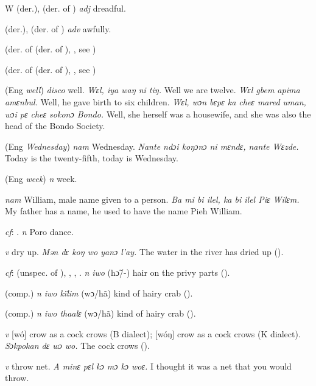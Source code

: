 \begin{letter}{W}
 (der.), (der. of ) \textit{adj} dreadful.

 (der.), (der. of ) \textit{adv} awfully. 

 (der. of  (der. of ), , see ) 

 (der. of  (der. of ), , see ) 

 (Eng \textit{well}) \textit{disco} well. \textit{Wɛl, iya waŋ ni tiŋ.} Well we are twelve. \textit{Wɛl gbem apima amɛnbul.} Well, he gave birth to six children. \textit{Wɛl, wɔn bɛpɛ ka cheɛ mared uman, wɔi pɛ cheɛ sokonɔ Bondo.} Well, she herself was a housewife, and she was also the head of the Bondo Society.

 (Eng \textit{Wednesday}) \textit{nam} Wednesday. \textit{Nante ndɔi koŋɔnɔ ni mɛndɛ, nante Wɛzde.} Today is the twenty-fifth, today is Wednesday.

 (Eng \textit{week}) \textit{n} week. 

 \textit{nam} William, male name given to a person. \textit{Ba mi bi ilel, ka bi ilel Piɛ Wilɛm.} My father has a name, he used to have the name Pieh William.

 \textit{cf}: . \textit{n} Poro dance.

 \textit{v} dry up. \textit{Mən dɛ koŋ wo yanɔ l'ay.} The water in the river has dried up (\citealt{Pichl1967}). 

 \textit{cf}:  (unspec. of ), , , . \textit{n} \textit{iwo} (hɔ̃/-) hair on the privy parts (\citealt{Pichl1967}).

 (comp.) \textit{n} \textit{iwo kïlim} (wɔ/hã) kind of hairy crab (\citealt{Pichl1967}).

 (comp.) \textit{n} \textit{iwo thaalɛ} (wɔ/hã) kind of hairy crab (\citealt{Pichl1967}).

 \textit{v} [wó] crow as a cock crows (B dialect); [wóŋ] crow as a cock crows (K dialect). \textit{Sɔkpokan dɛ wɔ wo.} The cock crows (\citealt{Pichl1967}). 

 \textit{v} throw net. \textit{A minɛ pɛl kɔ mɔ kɔ woɛ.} I thought it was a net that you would throw.


\end{letter}
